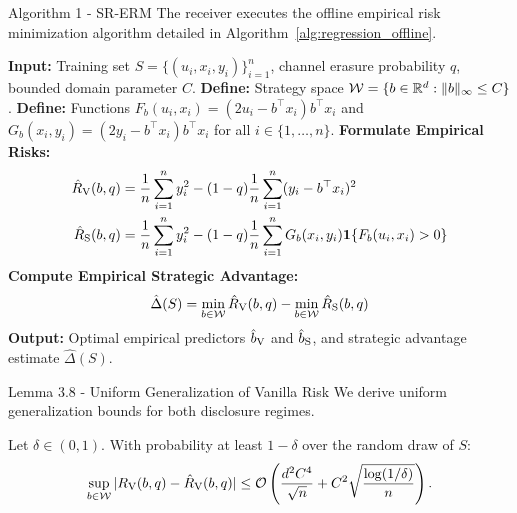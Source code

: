 \begin{sourceblock}{Algorithm 1 - SR-ERM}
The receiver executes the offline empirical risk minimization algorithm detailed in Algorithm~\ref{alg:regression_offline}.

\begin{algorithm}[htbp]
\caption{Strategic Regression Empirical Risk Minimization (SR-ERM)}
\label{alg:regression_offline}
\begin{algorithmic}[1]
\State \textbf{Input:} Training set $S = \{(u_i, x_i, y_i)\}_{i=1}^n$, channel erasure probability $q$, bounded domain parameter $C$.
\State \textbf{Define:} Strategy space $\mathcal{W} = \{b \in \mathbb{R}^d : \|b\|_\infty \le C\}$.
\State \textbf{Define:} Functions $F_b(u_i, x_i) = (2u_i - b^\top x_i)b^\top x_i$ and $G_b(x_i, y_i) = (2y_i - b^\top x_i)b^\top x_i$ for all $i \in \{1,\dots,n\}$.
\State \textbf{Formulate Empirical Risks:}
\begin{align*}
    \hat{R}_{\mathrm{V}}(b, q) &= \frac{1}{n}\sum_{i=1}^n y_i^2 - (1 - q)\frac{1}{n}\sum_{i=1}^n (y_i - b^\top x_i)^2 \\
    \hat{R}_{\mathrm{S}}(b, q) &= \frac{1}{n}\sum_{i=1}^n y_i^2 - (1 - q)\frac{1}{n}\sum_{i=1}^n G_b(x_i, y_i) \mathbf{1}\{F_b(u_i, x_i) > 0\}
\end{align*}
\State \textbf{Compute Empirical Strategic Advantage:}
\begin{equation*}
    \hat{\Delta}(S) = \min_{b \in \mathcal{W}} \hat{R}_{\mathrm{V}}(b, q) - \min_{b \in \mathcal{W}} \hat{R}_{\mathrm{S}}(b, q)
\end{equation*}
\State \textbf{Output:} Optimal empirical predictors $\hat{b}_{\mathrm{V}}$ and $\hat{b}_{\mathrm{S}}$, and strategic advantage estimate $\hat{\Delta}(S)$.
\end{algorithmic}
\end{algorithm}
\end{sourceblock}

\begin{faqblock}
\faqanswers
{}
\end{faqblock}

\begin{sourceblock}{Lemma 3.8 - Uniform Generalization of Vanilla Risk}
We derive uniform generalization bounds for both disclosure regimes.
\begin{lemma}
\label{lem:vanilla_generalization}
Let $\delta \in (0, 1)$. With probability at least $1 - \delta$ over the random draw of $S$:
\begin{equation}
    \label{eq:vanilla_gen_bound}
    \sup_{b \in \mathcal{W}} |R_{\mathrm{V}}(b, q) - \hat{R}_{\mathrm{V}}(b, q)| \le \mathcal{O}\left( \frac{d^2 C^4}{\sqrt{n}} + C^2 \sqrt{\frac{\log(1/\delta)}{n}} \right).
\end{equation}
\end{lemma}
\end{sourceblock}

